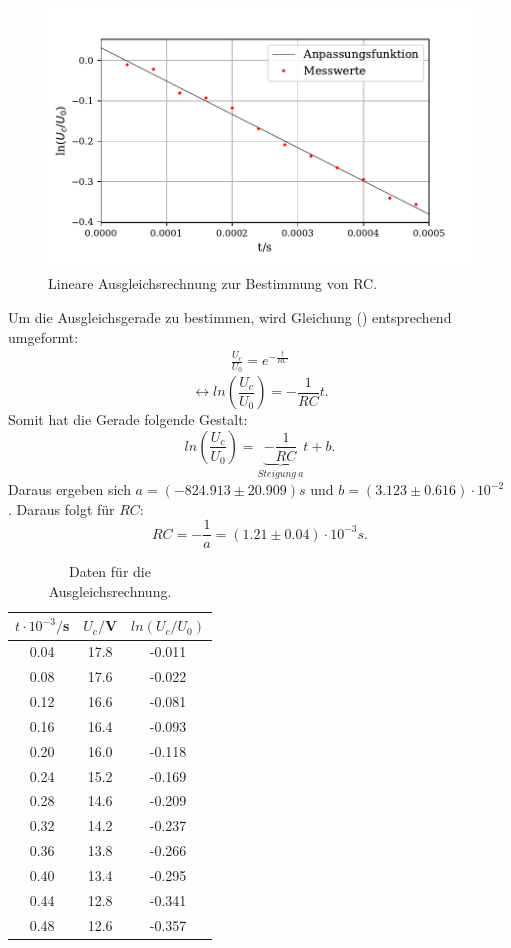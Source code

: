 \begin{figure}
  \centering
  \includegraphics{plot1.pdf}
  \caption{Lineare Ausgleichsrechnung zur Bestimmung von RC.}
  \label{fig:plot}
\end{figure}
\noindent Um die Ausgleichsgerade zu bestimmen, wird Gleichung () entsprechend umgeformt:
\begin{align*}
    \frac{U_c}{U_0} = e^{-\frac{t}{RC}}
\end{align*}
\begin{equation*}
    \leftrightarrow ln{(\frac{U_c}{U_0})} = -\frac{1}{RC}t .
\end{equation*}
Somit hat die Gerade folgende Gestalt:
\begin{equation}
    ln{(\frac{U_c}{U_0})} = \underbrace{-\frac{1}{RC}}_{Steigung \: a}t + b .
\end{equation}
Daraus ergeben sich $a = (-824.913 \pm 20.909) s$ und $b = (3.123 \pm 0.616) \cdot 10^{-2} $ .
Daraus folgt für $RC$:
\begin{equation*}
    RC = -\frac{1}{a} = (1.21 \pm 0.04)\cdot 10^{-3} s.
\end{equation*}

\begin{table}[H]
  \centering
  \caption{Daten für die Ausgleichsrechnung.}
  \label{tab:Parameter}
  \begin{tabular}{c c c}
    \toprule
    $t\cdot 10^{-3}/$s & $U_c/$V & $ln(U_c/U_0)$  \\
    \bottomrule
     0.04 & 17.8  & -0.011 \\
     0.08 & 17.6  & -0.022\\
     0.12& 16.6  & -0.081\\
     0.16& 16.4  & -0.093\\
     0.20 & 16.0  &-0.118\\
     0.24 & 15.2  &-0.169\\
     0.28 & 14.6  &-0.209\\
     0.32& 14.2 & -0.237\\
     0.36& 13.8  & -0.266\\
     0.40& 13.4  & -0.295\\
     0.44& 12.8  & -0.341\\
     0.48& 12.6  & -0.357\\
     
    \bottomrule
  \end{tabular}
\end{table}

